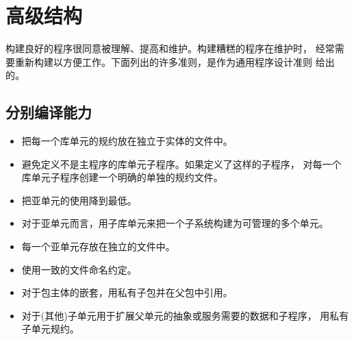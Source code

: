 %
%
%

\section{高级结构}
\begin{blockindent}
构建良好的程序很同意被理解、提高和维护。构建糟糕的程序在维护时，
经常需要重新构建以方便工作。下面列出的许多准则，是作为通用程序设计准则
给出的。
\end{blockindent}

\subsection{分别编译能力}
\label{c:prog-struct:high-level:separate-comp}
\begin{itemize}
\item 把每一个库单元的规约放在独立于实体的文件中。
\item 避免定义不是主程序的库单元子程序。如果定义了这样的子程序，
对每一个库单元子程序创建一个明确的单独的规约文件。
\item 把亚单元的使用降到最低。
\item 对于亚单元而言，用子库单元来把一个子系统构建为可管理的多个单元。
\item 每一个亚单元存放在独立的文件中。
\item 使用一致的文件命名约定。
\item 对于包主体的嵌套，用私有子包并在父包中引用。
\item 对于(其他)子单元用于扩展父单元的抽象或服务需要的数据和子程序，
 用私有子单元规约。
\end{itemize}

